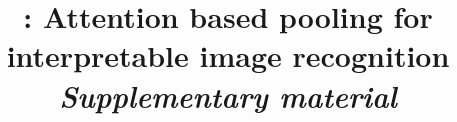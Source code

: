 \documentclass[10pt,twocolumn,letterpaper]{article}
\begin{document}

\clearpage
{\small


}


\clearpage
\title{\Ours: Attention based pooling for interpretable image recognition \\ \emph{Supplementary material}}

\maketitle

\appendix
\setcounter{page}{1}

\renewcommand{\thesection}{A\arabic{section}}
\renewcommand{\theequation}{A\arabic{equation}}
\renewcommand{\thetable}{A\arabic{table}}
\renewcommand{\thefigure}{A\arabic{figure}}


\end{document}
